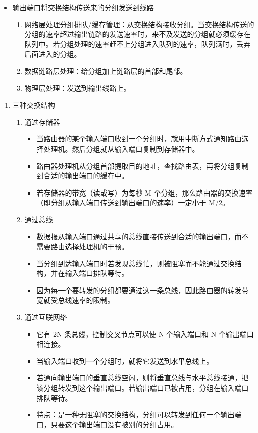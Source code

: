 \documentclass[11pt]{article}
\begin{document}
\begin{enumerate}
\begin{enumerate}
\begin{itemize}
\item 输出端口将交换结构传送来的分组发送到线路
\begin{enumerate}
\item 网络层处理分组排队/缓存管理：从交换结构接收分组。当交换结构传送的分组的速率超过输出链路的发送速率时，来不及发送的分组就必须缓存在队列中。若分组处理的速率赶不上分组进入队列的速率，队列满时，丢弃后面进入的分组。
\item 数据链路层处理：给分组加上链路层的首部和尾部。
\item 物理层处理：发送到输出线路上。
\end{enumerate}
\end{itemize}
\begin{enumerate}
\item 三种交换结构
\label{sec:orgc84c620}
\begin{enumerate}
\item 通过存储器
\begin{itemize}
\item 当路由器的某个输入端口收到一个分组时，就用中断方式通知路由选择处理机。然后分组就从输入端口复制到存储器中。
\item 路由器处理机从分组首部提取目的地址，查找路由表，再将分组复制到合适的输出端口的缓存中。
\item 若存储器的带宽（读或写）为每秒 M 个分组，那么路由器的交换速率（即分组从输入端口传送到输出端口的速率）一定小于 M/2。
\end{itemize}
\item 通过总线
\begin{itemize}
\item 数据报从输入端口通过共享的总线直接传送到合适的输出端口，而不需要路由选择处理机的干预。
\item 当分组到达输入端口时若发现总线忙，则被阻塞而不能通过交换结构，并在输入端口排队等待。
\item 因为每一个要转发的分组都要通过这一条总线，因此路由器的转发带宽就受总线速率的限制。
\end{itemize}
\item 通过互联网络
\begin{itemize}
\item 它有 2N 条总线，控制交叉节点可以使 N 个输入端口和 N 个输出端口相连接。
\item 当输入端口收到一个分组时，就将它发送到水平总线上。
\item 若通向输出端口的垂直总线空闲，则将垂直总线与水平总线接通，把该分组转发到这个输出端口。若输出端口已被占用，分组在输入端口排队等待。
\item 特点：是一种无阻塞的交换结构，分组可以转发到任何一个输出端口，只要这个输出端口没有被别的分组占用。

\end{itemize}
\end{enumerate}
\end{enumerate}
\end{enumerate}
\end{enumerate}
\end{document}
